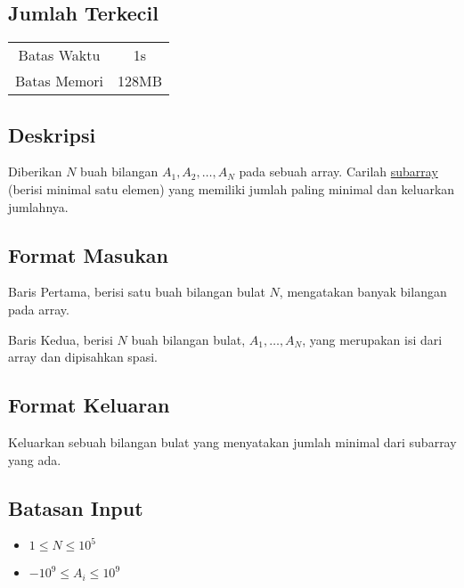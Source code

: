 \documentclass{article}
\begin{document}
\begin{center}
    \section*{Jumlah Terkecil} %

    \begin{tabular}{ | c c | }
        \hline
        Batas Waktu  & 1s \\    %
        Batas Memori & 128MB \\  %
        \hline
    \end{tabular}
\end{center}

\subsection*{Deskripsi}

Diberikan $N$ buah bilangan $A_1, A_2,\dots, A_N$ pada sebuah array. Carilah \href{https://en.wiktionary.org/wiki/subarray}{subarray} (berisi minimal satu elemen) yang memiliki jumlah paling minimal dan keluarkan jumlahnya.

\subsection*{Format Masukan}
Baris Pertama, berisi satu buah bilangan bulat $N$, mengatakan banyak bilangan pada array.

Baris Kedua, berisi $N$ buah bilangan bulat, $A_1,\dots, A_N$, yang merupakan isi dari array dan dipisahkan spasi.

\subsection*{Format Keluaran}
Keluarkan sebuah bilangan bulat yang menyatakan jumlah minimal dari subarray yang ada.

\subsection*{Batasan Input}

\begin{itemize}
    \item{$1 \leq N \leq 10^5$}
    \item{$-10^9 \leq A_i \leq 10^9$}
\end{itemize}
\end{document}
